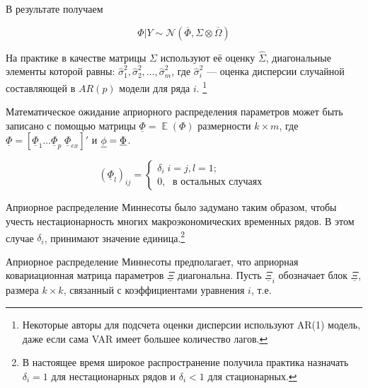 \documentclass[11pt]{article} %
\DeclareMathOperator{\E}{\mathbb{E}}
\newcommand{\cN}{\mathcal{N}}
\newcommand{\prior}{\underline}
\newcommand{\post}{\overline}
\let\vec\relax
\DeclareMathOperator{\vec}{vec}
\begin{document}
В результате получаем 

\[
\Phi | Y \sim \cN (\post\Phi, \Sigma \otimes \post\Omega)
\]

На практике в качестве матрицы $\Sigma$ используют её оценку $\hat\Sigma$, диагональные элементы которой равны: $\hat\sigma_{1}^2, \hat\sigma_{2}^2,\ldots,\hat\sigma_{m}^2 $, где  $\hat\sigma_{i}^2$ --- оценка дисперсии случайной составляющей в $AR(p)$ модели для ряда $i$. \footnote{Некоторые авторы для подсчета оценки дисперсии используют AR(1) модель, даже если сама VAR имеет большее количество лагов.}

Математическое ожидание априорного распределения параметров может быть записано с помощью матрицы $\prior \Phi = \E (\Phi)$ размерности $k\times m$, где $\prior\Phi=[\prior\Phi_1 \ldots \prior\Phi_p \; \prior\Phi_{ex}]'$ и $\prior \phi = \vec{ \prior \Phi}$.


\begin{equation}
(\prior\Phi_l)_{ij}=
\begin{cases}
\delta_i\; i=j, l=1;\\
0,\;\text{ в остальных случаях }
\end{cases}\label{minnesota_exp}
\end{equation}


Априорное распределение Миннесоты было задумано таким образом, чтобы учесть нестационарность многих макроэкономических временных рядов. В этом случае $\delta_{i}$, принимают значение единица.\footnote{В настоящее время широкое распространение получила практика назначать $\delta_{i}=1$ для нестационарных рядов и $\delta_{i}<1$ для стационарных.}

Априорное распределение Миннесоты предполагает, что априорная ковариационная матрица параметров $\prior \Xi$ диагональна. Пусть $\prior \Xi_i$ обозначает блок $\prior \Xi$, размера $k\times k$, связанный с коэффициентами уравнения $i$, т.е.  
\end{document}
